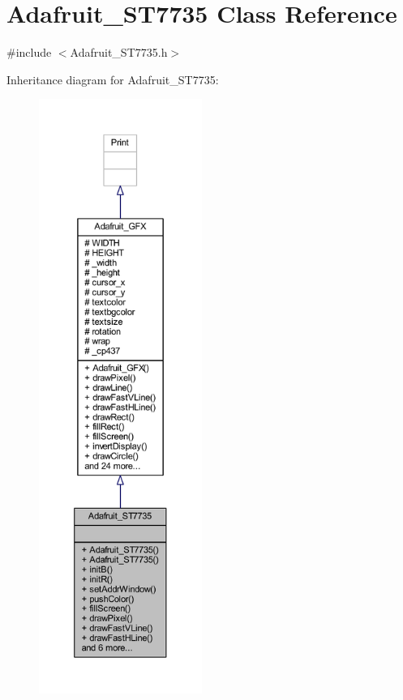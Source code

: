 \hypertarget{class_adafruit___s_t7735}{}\section{Adafruit\+\_\+\+S\+T7735 Class Reference}
\label{class_adafruit___s_t7735}


{\ttfamily \#include $<$Adafruit\+\_\+\+S\+T7735.\+h$>$}



Inheritance diagram for Adafruit\+\_\+\+S\+T7735\+:\nopagebreak
\begin{figure}[H]
\begin{center}
\leavevmode
\includegraphics[height=550pt]{class_adafruit___s_t7735__inherit__graph}
\end{center}
\end{figure}


